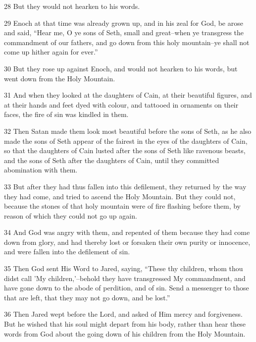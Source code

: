 \par 28 But they would not hearken to his words.

\par 29 Enoch at that time was already grown up, and in his zeal for God, be arose and said, “Hear me, O ye sons of Seth, small and great--when ye transgress the commandment of our fathers, and go down from this holy mountain--ye shall not come up hither again for ever.”

\par 30 But they rose up against Enoch, and would not hearken to his words, but went down from the Holy Mountain.

\par 31 And when they looked at the daughters of Cain, at their beautiful figures, and at their hands and feet dyed with colour, and tattooed in ornaments on their faces, the fire of sin was kindled in them.

\par 32 Then Satan made them look most beautiful before the sons of Seth, as he also made the sons of Seth appear of the fairest in the eyes of the daughters of Cain, so that the daughters of Cain lusted after the sons of Seth like ravenous beasts, and the sons of Seth after the daughters of Cain, until they committed abomination with them.

\par 33 But after they had thus fallen into this defilement, they returned by the way they had come, and tried to ascend the Holy Mountain. But they could not, because the stones of that holy mountain were of fire flashing before them, by reason of which they could not go up again.

\par 34 And God was angry with them, and repented of them because they had come down from glory, and had thereby lost or forsaken their own purity or innocence, and were fallen into the defilement of sin.

\par 35 Then God sent His Word to Jared, saying, “These thy children, whom thou didst call 'My children,'--behold they have transgressed My commandment, and have gone down to the abode of perdition, and of sin. Send a messenger to those that are left, that they may not go down, and be lost.”

\par 36 Then Jared wept before the Lord, and asked of Him mercy and forgiveness. But he wished that his soul might depart from his body, rather than hear these words from God about the going down of his children from the Holy Mountain.

